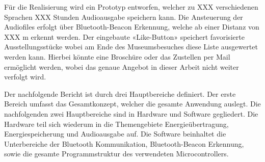 Für die Realisierung wird ein Prototyp entworfen, welcher zu XXX verschiedenen Sprachen XXX Stunden Audioausgabe speichern kann. Die Ansteuerung der Audiofiles erfolgt über Bluetooth-Beacon Erkennung, welche ab einer Distanz von XXX m erkennt werden. Der eingebaute «Like-Button» speichert favorisierte Ausstellungsstücke wobei am Ende des Museumsbesuches diese Liste ausgewertet werden kann. Hierbei könnte eine Broschüre oder das Zustellen per Mail ermöglicht werden, wobei das genaue Angebot in dieser Arbeit nicht weiter verfolgt wird.

Der nachfolgende Bericht ist durch drei Hauptbereiche definiert. Der erste Bereich umfasst das Gesamtkonzept, welcher die gesamte Anwendung auslegt. Die nachfolgenden zwei Hauptbereiche sind in Hardware und Software gegliedert. Die Hardware teil sich wiederum in die Themengebiete Energieübertragung, Energiespeicherung und Audioausgabe auf. Die Software beinhaltet die Unterbereiche der Bluetooth Kommunikation, Bluetooth-Beacon Erkennung, sowie die gesamte Programmstruktur des verwendeten Microcontrollers.
